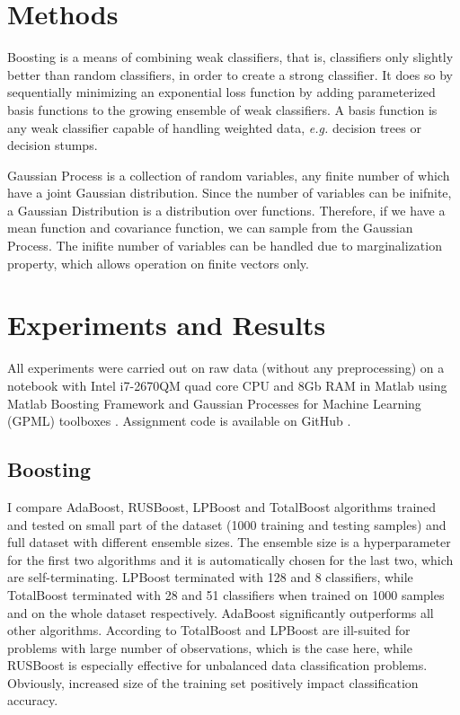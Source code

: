 \documentclass[journal, a4paper]{IEEEtran}
\begin{document}
\section{Methods}
    Boosting is a means of combining weak classifiers, that is, classifiers only slightly better than random classifiers, in order to create a strong classifier. It does so by sequentially minimizing an exponential loss function by adding parameterized basis functions to the growing ensemble of weak classifiers. A basis function is any weak classifier capable of handling weighted data, \textit{e.g.} decision trees or decision stumps.
    
    Gaussian Process is a collection of random variables, any finite number of which have a joint Gaussian distribution. Since the number of variables can be inifnite, a Gaussian Distribution is a distribution over functions. Therefore, if we have a mean function and covariance function, we can sample from the Gaussian Process. The inifite number of variables can be handled due to marginalization property, which allows operation on finite vectors only.

\section {Experiments and Results}
  All experiments were carried out on raw data (without any preprocessing) on a notebook with Intel i7-2670QM quad core CPU and 8Gb RAM in Matlab using Matlab Boosting Framework \cite{MATLAB_BOOST} and Gaussian Processes for Machine Learning (GPML) toolboxes \cite{GPML}. Assignment code is available on GitHub \cite{code}.
  
  \subsection{Boosting}
      I compare AdaBoost, RUSBoost, LPBoost and TotalBoost algorithms trained and tested on small part of the dataset (1000 training and testing samples) and full dataset with different ensemble sizes. The ensemble size is a hyperparameter for the first two algorithms and it is automatically chosen for the last two, which are self-terminating. LPBoost terminated with 128 and 8 classifiers, while TotalBoost terminated with 28 and 51 classifiers when trained on 1000 samples and on the whole dataset respectively. AdaBoost significantly outperforms all other algorithms. According to \cite{MATLAB_BOOST} TotalBoost and LPBoost are ill-suited for problems with large number of observations, which is the case here, while RUSBoost is especially effective for unbalanced data classification problems. Obviously, increased size of the training set positively impact classification accuracy.
  
\end{document}
